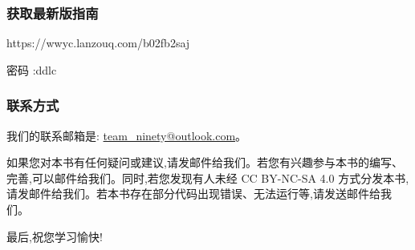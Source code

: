 \subsubsection*{获取最新版指南}
https://wwyc.lanzouq.com/b02fb2saj

密码 :ddlc

\subsubsection*{联系方式}
我们的联系邮箱是: \url{team_ninety@outlook.com}。
\newline\newline\par
如果您对本书有任何疑问或建议,请发邮件给我们。若您有兴趣参与本书的编写、完善,可以邮件给我们。同时,若您发现有人未经 CC BY-NC-SA 4.0 方式分发本书,请发邮件给我们。若本书存在部分代码出现错误、无法运行等,请发送邮件给我们。

最后,祝您学习愉快!